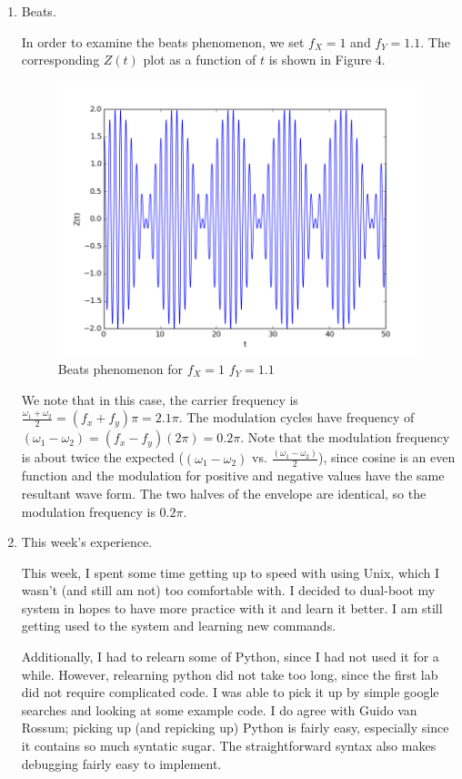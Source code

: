 \documentclass{article}
\begin{document}
\begin{enumerate}
	\item Beats.
	
	In order to examine the beats phenomenon, we set $f_X = 1$ and $f_Y = 1.1$. The corresponding $Z(t)$ plot as a function of $t$ is shown in Figure 4.
	
	\begin{figure}[h]
		\centering
		\includegraphics[width=0.4\linewidth]{fig12.png}
		
		\caption{Beats phenomenon for $f_X = 1$ $f_Y = 1.1$}
	\end{figure}
	
	We note that in this case, the carrier frequency is $\frac{\omega_1 + \omega_2}{2} = (f_x + f_y) \pi = 2.1 \pi$. The modulation cycles have frequency of $(\omega_1 - \omega_2) = (f_x - f_y)(2\pi) = 0.2\pi$. Note that the modulation frequency is about twice the expected ($(\omega_1 - \omega_2)$ vs. $\frac{(\omega_1 - \omega_2)}{2}$), since cosine is an even function and the modulation for positive and negative values have the same resultant wave form. The two halves of the envelope are identical, so the modulation frequency is $0.2\pi$.
	
	\item This week's experience.
	
	This week, I spent some time getting up to speed with using Unix, which I wasn't (and still am not) too comfortable with. I decided to dual-boot my system in hopes to have more practice with it and learn it better. I am still getting used to the system and learning new commands.
	
	Additionally, I had to relearn some of Python, since I had not used it for a while. However, relearning python did not take too long, since the first lab did not require complicated code. I was able to pick it up by simple google searches and looking at some example code. I do agree with Guido van Rossum; picking up (and repicking up) Python is fairly easy, especially since it contains so much syntatic sugar. The straightforward syntax also makes debugging fairly easy to implement.

\end{enumerate}
\end{document}
